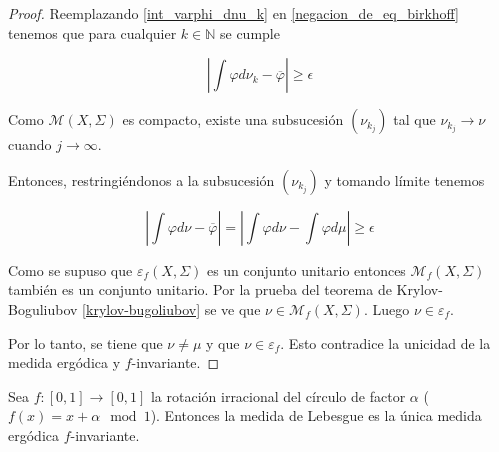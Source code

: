 \begin{proof}
	Reemplazando \eqref{int_varphi_dnu_k} en \eqref{negacion_de_eq_birkhoff} tenemos que para cualquier $k \in \mathbb{N}$ se cumple
	
	\begin{equation}
		\left| \int \varphi d\nu_k - \overline{\varphi} \right| \geq \epsilon
	\end{equation}
	
	Como $\mathcal{M}(X,\Sigma)$ es compacto, existe una subsucesión $(\nu_{k_j})$ tal que $\nu_{k_j} \rightarrow \nu$ cuando $j \rightarrow \infty$.
	
	Entonces, restringiéndonos a la subsucesión $(\nu_{k_j})$ y tomando límite tenemos
	
	\begin{equation}
		\left| \int \varphi d\nu - \overline{\varphi} \right| = \left| \int \varphi d\nu - \int \varphi d\mu \right| \geq \epsilon
	\end{equation}
	
	Como se supuso que $\varepsilon_f(X,\Sigma)$ es un conjunto unitario entonces $\mathcal{M}_f(X,\Sigma)$ también es un conjunto unitario. Por la prueba del teorema de Krylov-Boguliubov \ref{krylov-bugoliubov} se ve que $\nu \in \mathcal{M}_f(X,\Sigma)$. Luego $\nu \in \varepsilon_f$. 
	
	Por lo tanto, se tiene que $\nu \neq \mu$  y que $\nu \in \varepsilon_f$. Esto contradice la unicidad de la medida ergódica y $f$-invariante.
\end{proof}



\begin{teorema}\label{main1}
  Sea $ f: [0,1] \rightarrow [0,1] $ la rotación irracional del círculo de factor $ \alpha $ ($ f(x) = x+\alpha \mod 1 $). Entonces la medida de Lebesgue es la única medida ergódica $f$-invariante.
\end{teorema}

